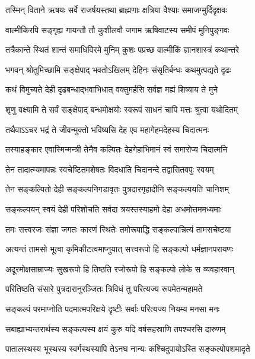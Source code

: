 \twolineshloka
{तस्मिन् विताने ऋषयः सर्वे राजर्षयस्तथा}
{ब्राह्मणाः क्षत्रिया वैश्याः समाजग्मुर्दिदृक्षवः} %

\twolineshloka
{वाल्मीकिरपि सङ्गृह्य गायन्तौ तौ कुशीलवौ}
{जगाम ऋषिवाटस्य समीपं मुनिपुङ्गवः} %

\twolineshloka
{तत्रैकान्ते स्थितं शान्तं समाधिविरमे मुनिम्}
{कुशः पप्रच्छ वाल्मीकिं ज्ञानशास्त्रं कथान्तरे} %

\twolineshloka
{भगवन् श्रोतुमिच्छामि सङ्क्षेपाद् भवतोऽखिलम्}
{देहिनः संसृतिर्बन्धः कथमुत्पद्यते दृढः} %

\twolineshloka
{कथं विमुच्यते देही दृढबन्धाद्भवाभिधात्}
{वक्तुमर्हसि सर्वज्ञ मह्यं शिष्याय ते मुने} %


\twolineshloka
{शृणु वक्ष्यामि ते सर्वं सङ्क्षेपाद् बन्धमोक्षयोः}
{स्वरूपं साधनं चापि मत्तः श्रुत्वा यथोदितम्} %

\twolineshloka
{तथैवाऽऽचर भद्रं ते जीवन्मुक्तो भविष्यसि}
{देह एव महागेहमदेहस्य चिदात्मनः} %

\twolineshloka
{तस्याहङ्कार एवास्मिन्मन्त्री तेनैव कल्पितः}
{देहगेहाभिमानं स्वं समारोप्य चिदात्मनि} %

\twolineshloka
{तेन तादात्म्यमापन्नः स्वचेष्टितमशेषतः}
{विदधाति चिदानन्दे तद्वासितवपुः स्वयम्} %

\twolineshloka
{तेन सङ्कल्पितो देही सङ्कल्पनिगडावृतः}
{पुत्रदारगृहादीनि सङ्कल्पयति चानिशम्} %

\twolineshloka
{सङ्कल्पयन् स्वयं देही परिशोचति सर्वदा}
{त्रयस्तस्याहमो देहा अधमोत्तममध्यमाः} %

\twolineshloka
{तमः सत्त्वरजः संज्ञा जगतः कारणं स्थितेः}
{तमोरूपाद्धि सङ्कल्पान्नित्यं तामसचेष्टया} %

\twolineshloka
{अत्यन्तं तामसो भूत्वा कृमिकीटत्वमाप्नुयात्}
{सत्त्वरूपो हि सङ्कल्पो धर्मज्ञानपरायणः} %

\twolineshloka
{अदूरमोक्षसाम्राज्यः सुखरूपो हि तिष्ठति}
{रजोरूपो हि सङ्कल्पो लोके स व्यवहारवान्} %

\twolineshloka
{परितिष्ठति संसारे पुत्रदारानुरञ्जितः}
{त्रिविधं तु परित्यज्य रूपमेतन्महामते} %

\twolineshloka
{सङ्कल्पं परमाप्नोति पदमात्मपरिक्षये}
{दृष्टीः सर्वाः परित्यज्य नियम्य मनसा मनः} %

\twolineshloka
{सबाह्याभ्यन्तरार्थस्य सङ्कल्पस्य क्षयं कुरु}
{यदि वर्षसहस्राणि तपश्चरसि दारुणम्} %

\twolineshloka
{पातालस्थस्य भूस्थस्य स्वर्गस्थस्यापि तेऽनघ}
{नान्यः कश्चिदुपायोऽस्ति सङ्कल्पोपशमादृते} %

